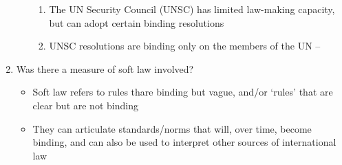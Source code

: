 \begin{enumerate}
\begin{enumerate}
        \begin{enumerate}
            \item The UN Security Council (UNSC) has limited law-making capacity, but can adopt certain binding resolutions
            \item UNSC resolutions are binding only on the members of the UN -- 
        \end{enumerate}
    \end{enumerate}
    \item Was there a measure of soft law involved?
    \begin{itemize}
        \item Soft law refers to rules thare binding but vague, and/or `rules' that are clear but are not binding
        \item They can articulate standards/norms that will, over time, become binding, and can also be used to interpret other sources of international law
    \end{itemize}
\end{enumerate}

